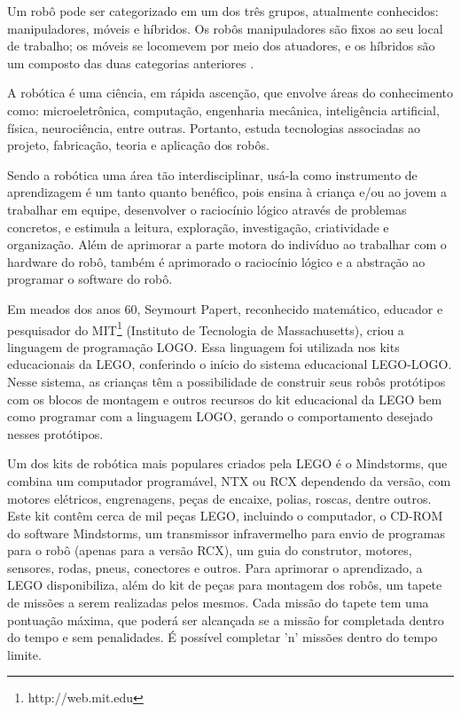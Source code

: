 Um robô pode ser categorizado em um dos três grupos, atualmente conhecidos: manipuladores, móveis e híbridos. Os robôs manipuladores são fixos ao seu local de trabalho; os móveis se locomevem por meio dos atuadores, e os híbridos são um composto das duas categorias anteriores  .

A robótica é uma ciência, em rápida ascenção, que envolve áreas do conhecimento como: microeletrônica, computação, engenharia mecânica, inteligência artificial, física, neurociência, entre outras. Portanto, estuda tecnologias associadas ao projeto, fabricação, teoria e aplicação dos robôs.
	
Sendo a robótica uma área tão interdisciplinar, usá-la como instrumento de aprendizagem é um tanto quanto benéfico, pois ensina à criança e/ou ao jovem a trabalhar em equipe, desenvolver o raciocínio lógico através de problemas concretos, e estimula a leitura, exploração, investigação, criatividade e organização. Além de aprimorar a parte motora do indivíduo ao trabalhar com o hardware do robô, também é aprimorado o raciocínio lógico e a abstração ao programar o software do robô. 

Em meados dos anos 60, Seymourt Papert, reconhecido matemático, educador e pesquisador do MIT\footnote{http://web.mit.edu} (Instituto de Tecnologia de Massachusetts), criou a linguagem de programação LOGO. Essa linguagem foi utilizada nos kits educacionais da LEGO, conferindo o início do sistema educacional LEGO-LOGO. Nesse sistema, as crianças têm a possibilidade de construir seus robôs protótipos com os blocos de montagem e outros recursos do kit educacional da LEGO bem como programar com a linguagem LOGO, gerando o comportamento desejado nesses protótipos.

Um dos kits de robótica mais populares criados pela LEGO é o Mindstorms, que combina um computador programável, NTX ou RCX dependendo da versão, com motores elétricos, engrenagens, peças de encaixe, polias, roscas, dentre outros. Este kit contêm cerca de mil peças LEGO, incluindo o computador, o CD-ROM do software Mindstorms, um transmissor infravermelho para envio de programas para o robô (apenas para a versão RCX), um guia do construtor, motores, sensores, rodas, pneus, conectores e outros. Para aprimorar o aprendizado, a LEGO disponibiliza, além do kit de peças para montagem dos robôs, um tapete de missões a serem realizadas pelos mesmos. Cada missão do tapete tem uma pontuação máxima, que poderá ser alcançada se a missão for completada dentro do tempo e sem penalidades. É possível completar 'n' missões dentro do tempo limite.

